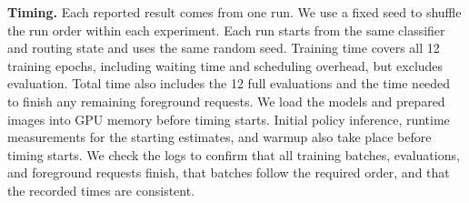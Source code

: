 \noindent \textbf{Timing.}
Each reported result comes from one run.
We use a fixed seed to shuffle the run order within each experiment.
Each run starts from the same classifier and routing state and uses the same random seed.
Training time covers all 12 training epochs, including waiting time and scheduling overhead, but excludes evaluation.
Total time also includes the 12 full evaluations and the time needed to finish any remaining foreground requests.
We load the models and prepared images into GPU memory before timing starts.
Initial policy inference, runtime measurements for the starting estimates, and warmup also take place before timing starts.
We check the logs to confirm that all training batches, evaluations, and foreground requests finish, that batches follow the required order, and that the recorded times are consistent.
\par
\endgroup
